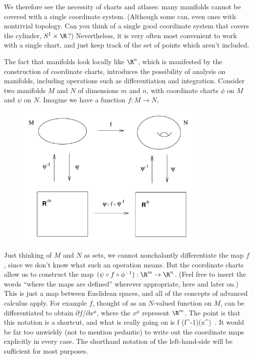 \documentclass[12pt]{article}
\begin{document}
We therefore see the necessity of charts and atlases: many manifolds
cannot be covered with a single coordinate system.  (Although some
can, even ones with nontrivial topology.  Can you think of a single
good coordinate system that covers the cylinder, $S^1\times\R$?)
Nevertheless, it is very often most convenient to work with a single
chart, and just keep track of the set of points which aren't included.

The fact that manifolds look locally like $\R^n$, which is manifested
by the construction of coordinate charts, introduces the possibility
of analysis on manifolds, including operations such as differentiation
and integration.  Consider two manifolds $M$ and $N$ of dimensions
$m$ and $n$, with coordinate charts $\phi$ on $M$ and $\psi$ on $N$.
Imagine we have a function $f:M\rightarrow N$,

\begin{figure}[h]
  \centerline{
  \includegraphics[height=7cm]{pdf/two14}}
\end{figure}

\noindent Just thinking of $M$ and $N$ as sets, we cannot nonchalantly
differentiate the map $f$, since we don't know what such an operation
means.  But the coordinate charts allow us to construct the map
$(\psi\circ f\circ\phi^{-1}):\R^m\rightarrow\R^n$.  (Feel free to
insert the words ``where the maps are defined'' wherever appropriate,
here and later on.)  This is just
a map between Euclidean spaces, and all of the concepts of advanced
calculus apply.  For example $f$, thought of as an $N$-valued
function on $M$, can be differentiated to obtain ${\partial f}/
{\partial x^\mu}$, where the $x^\mu$ represent $\R^m$.
The point is that this notation is a shortcut, and what is really
going on is
\be
  {{\partial f}} 
  (\psi\circ f\circ\phi^{-1})(x^{\mu})\ .\label{2.7}
\ee
It would be far too unwieldy (not to mention pedantic) to write out
the coordinate maps explicitly in every case.  The shorthand notation
of the left-hand-side will be sufficient for most purposes.
\end{document}
